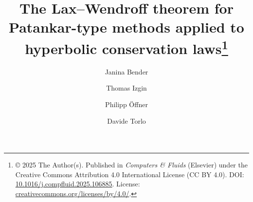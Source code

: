 \documentclass[final,11pt, times, linenumber, nopreprintline]{elsarticle}
\begin{document}

\begin{frontmatter}
	
\title{The Lax--Wendroff theorem for Patankar-type methods applied to hyperbolic conservation laws\footnote{%
		© 2025 The Author(s). Published in \textit{Computers \& Fluids} (Elsevier) under the Creative Commons Attribution 4.0 International License (CC BY 4.0). 
		DOI: \href{https://doi.org/10.1016/j.compfluid.2025.106885}{10.1016/j.compfluid.2025.106885}. 
		License: \href{https://creativecommons.org/licenses/by/4.0/}{creativecommons.org/licenses/by/4.0/}.
}}

\author[1]{Janina {Bender}}
\author[1]{Thomas {Izgin}}
\author[3]{Philipp {Öffner}}
\author[4]{Davide {Torlo}}







\begin{abstract}


\end{abstract}
\end{frontmatter}
\end{document}
